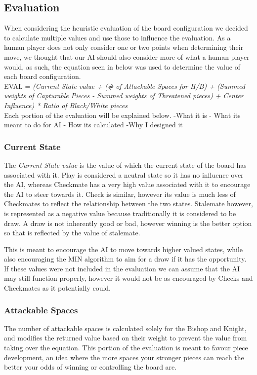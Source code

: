 \documentclass[conference]{IEEEtran}
\begin{document}
\subsection{Evaluation}
When considering the heuristic evaluation of the board configuration we decided to calculate multiple values and use those to influence the evaluation. As a human player does not only consider one or two points when determining their move, we thought that our AI should also consider more of what a human player would, as such, the equation seen in below was used to determine the value of each board configuration. \\

EVAL = \textit{(Current State value + (\# of Attackable Spaces for H/B) + (Summed weights of Capturable Pieces - Summed weights of Threatened pieces) + Center Influence) * Ratio of Black/White pieces} \\

Each portion of the evaluation will be explained below.
-What it is
- What its meant to do for AI
- How its calculated
-Why I designed it

\subsubsection{Current State}
The \textit{Current State value} is the value of which the current state of the board has associated with it. Play is considered a neutral state so it has no influence over the AI, whereas Checkmate has a very high value associated with it to encourage the AI to steer towards it. Check is similar, however its value is much less of Checkmates to reflect the relationship between the two states. Stalemate however, is represented as a negative value because traditionally it is considered to be draw. A draw is not inherently good or bad, however winning is the better option so that is reflected by the value of stalemate. 

This is meant to encourage the AI to move towards higher valued states, while also encouraging the MIN algorithm to aim for a draw if it has the opportunity. If these values were not included in the evaluation we can assume that the AI may still function properly, however it would not be as encouraged by Checks and Checkmates as it potentially could.

\subsubsection{Attackable Spaces}
The number of attackable spaces is calculated solely for the Bishop and Knight, and modifies the returned value based on their weight to prevent the value from taking over the equation. This portion of the evaluation is meant to favour piece development, an idea where the more spaces your stronger pieces can reach the better your odds of winning or controlling the board are. 
\end{document}
